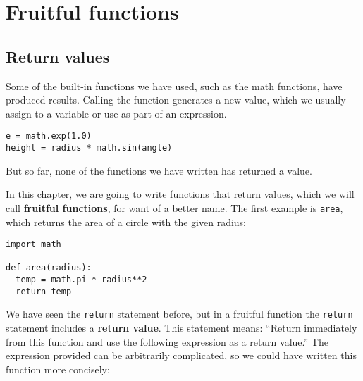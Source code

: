 

\chapter{Fruitful functions}

\section{Return values}

Some of the built-in functions we have used, such as the math
functions, have produced results.  Calling the function generates a
new value, which we usually assign to a variable or use as part of an
expression.

\beforeverb
\begin{verbatim}
e = math.exp(1.0)
height = radius * math.sin(angle)
\end{verbatim}
\afterverb
%
But so far, none of the functions we have written has returned a
value.

In this chapter, we are going to write functions that return values,
which we will call {\bf fruitful functions}, for want of a better
name.  The first example is {\tt area}, which returns the area of a
circle with the given radius:

\beforeverb
\begin{verbatim}
import math

def area(radius):
  temp = math.pi * radius**2
  return temp
\end{verbatim}
\afterverb
%
We have seen the {\tt return} statement before, but in a fruitful
function the {\tt return} statement includes
a {\bf return value}.  This statement means: ``Return immediately from
this function and use the following expression as a return value.''
The expression provided can be arbitrarily complicated, so we could
have written this function more concisely:

